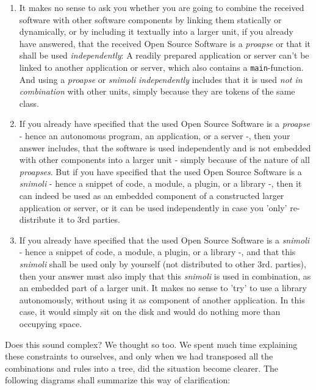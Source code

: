\begin{enumerate}
  
  \item It makes no sense to ask you
  whether you are going to combine the received software with other software
  components by linking them statically or dynamically, or by including it
  textually into a larger unit, if you already have answered, that the received
  Open Source Software is a \emph{proapse} or that it shall be used
  \emph{independently}: A readily prepared application or server can't be linked
  to another application or server, which also contains a
  \texttt{main}-function. And using a \emph{proapse} or \emph{snimoli}
  \emph{independently} includes that it is used \emph{not in combination} with
  other units, simply because they are tokens of the same class.
  
  \item If you already have specified that the used Open Source Software is a
  \emph{proapse} - hence an autonomous program, an application, or a server -,
  then your answer includes, that the software is used independently and is not
  embedded with other components into a larger unit - simply because of the
  nature of all \emph{proapses}. But if you have specified that the used Open
  Source Software is a \emph{snimoli} - hence a snippet of code, a module, a
  plugin, or a library -, then it can indeed be used as an embedded component of
  a constructed larger application or server, or it can be used independently in
  case you 'only' re-distribute it to 3rd parties.
  
  \item If you already have specified that the used Open Source Software is a
  \emph{snimoli} - hence a snippet of code, a module, a plugin, or a library -,
  and that this \emph{snimoli} shall be used only by yourself (not distributed
  to other 3rd. parties), then your answer must also imply that this
  \emph{snimoli} is used in combination, as an embedded part of a larger unit.
  It makes no sense to 'try' to use a library autonomously, without using it
  as component of another application. In this case, it would simply sit on the
  disk and would do nothing more than occupying space.

\end{enumerate}

Does this sound complex? We thought so too. We spent much
time explaining these constraints to ourselves, and only when we had transposed
all the combinations and rules into a tree, did the situation become clearer.
The following diagrams shall summarize this way of clarification:

%
